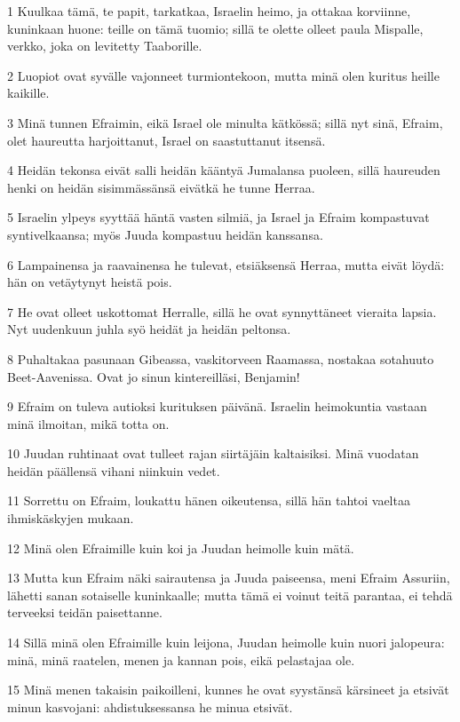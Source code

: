 \par 1 Kuulkaa tämä, te papit, tarkatkaa, Israelin heimo, ja ottakaa korviinne, kuninkaan huone: teille on tämä tuomio; sillä te olette olleet paula Mispalle, verkko, joka on levitetty Taaborille.
\par 2 Luopiot ovat syvälle vajonneet turmiontekoon, mutta minä olen kuritus heille kaikille.
\par 3 Minä tunnen Efraimin, eikä Israel ole minulta kätkössä; sillä nyt sinä, Efraim, olet haureutta harjoittanut, Israel on saastuttanut itsensä.
\par 4 Heidän tekonsa eivät salli heidän kääntyä Jumalansa puoleen, sillä haureuden henki on heidän sisimmässänsä eivätkä he tunne Herraa.
\par 5 Israelin ylpeys syyttää häntä vasten silmiä, ja Israel ja Efraim kompastuvat syntivelkaansa; myös Juuda kompastuu heidän kanssansa.
\par 6 Lampainensa ja raavainensa he tulevat, etsiäksensä Herraa, mutta eivät löydä: hän on vetäytynyt heistä pois.
\par 7 He ovat olleet uskottomat Herralle, sillä he ovat synnyttäneet vieraita lapsia. Nyt uudenkuun juhla syö heidät ja heidän peltonsa.
\par 8 Puhaltakaa pasunaan Gibeassa, vaskitorveen Raamassa, nostakaa sotahuuto Beet-Aavenissa. Ovat jo sinun kintereilläsi, Benjamin!
\par 9 Efraim on tuleva autioksi kurituksen päivänä. Israelin heimokuntia vastaan minä ilmoitan, mikä totta on.
\par 10 Juudan ruhtinaat ovat tulleet rajan siirtäjäin kaltaisiksi. Minä vuodatan heidän päällensä vihani niinkuin vedet.
\par 11 Sorrettu on Efraim, loukattu hänen oikeutensa, sillä hän tahtoi vaeltaa ihmiskäskyjen mukaan.
\par 12 Minä olen Efraimille kuin koi ja Juudan heimolle kuin mätä.
\par 13 Mutta kun Efraim näki sairautensa ja Juuda paiseensa, meni Efraim Assuriin, lähetti sanan sotaiselle kuninkaalle; mutta tämä ei voinut teitä parantaa, ei tehdä terveeksi teidän paisettanne.
\par 14 Sillä minä olen Efraimille kuin leijona, Juudan heimolle kuin nuori jalopeura: minä, minä raatelen, menen ja kannan pois, eikä pelastajaa ole.
\par 15 Minä menen takaisin paikoilleni, kunnes he ovat syystänsä kärsineet ja etsivät minun kasvojani: ahdistuksessansa he minua etsivät.

